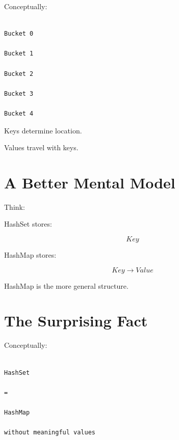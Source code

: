 \documentclass[11pt,a4paper]{book}
\begin{document}
Conceptually:

\begin{verbatim}

Bucket 0

Bucket 1

Bucket 2

Bucket 3

Bucket 4

\end{verbatim}


Keys determine location.


Values travel with keys.


\section{A Better Mental Model}

Think:


HashSet stores:

\[
Key
\]


HashMap stores:

\[
Key
\rightarrow
Value
\]


HashMap is the more general structure.


\section{The Surprising Fact}

Conceptually:

\begin{verbatim}

HashSet

=

HashMap

without meaningful values

\end{verbatim}
\end{document}
